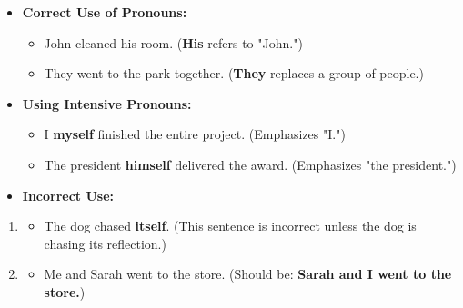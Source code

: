 \documentclass[12pt]{article}
\begin{document}
\begin{tcolorbox}[colframe=black!60, colback=white, 
coltitle=black, colbacktitle=black!15, fonttitle=\bfseries\Large, 
title=Examples, halign title=center, left=10pt, right=10pt, top=10pt, bottom=15pt]


\begin{itemize}
    \item \textbf{Correct Use of Pronouns:} 
    \begin{itemize}
        \item John cleaned his room. (\textbf{His} refers to "John.")
        \item They went to the park together. (\textbf{They} replaces a group of people.)
    \end{itemize}

    \item \textbf{Using Intensive Pronouns:}
    \begin{itemize}
        \item I \textbf{myself} finished the entire project. (Emphasizes "I.")
        \item The president \textbf{himself} delivered the award. (Emphasizes "the president.")
    \end{itemize}
\end{itemize}

\begin{itemize}
    \item \textbf{Incorrect Use:}
\end{itemize}
\begin{enumerate}
\item
    \begin{itemize}
        \item The dog chased \textbf{itself}. (This sentence is incorrect unless the dog is chasing its reflection.)
    \end{itemize}
    \item
    \begin{itemize}
        \item Me and Sarah went to the store. (Should be: \textbf{Sarah and I went to the store.})
    \end{itemize}
\end{enumerate}

\end{tcolorbox}

\vspace{1em}
\end{document}
